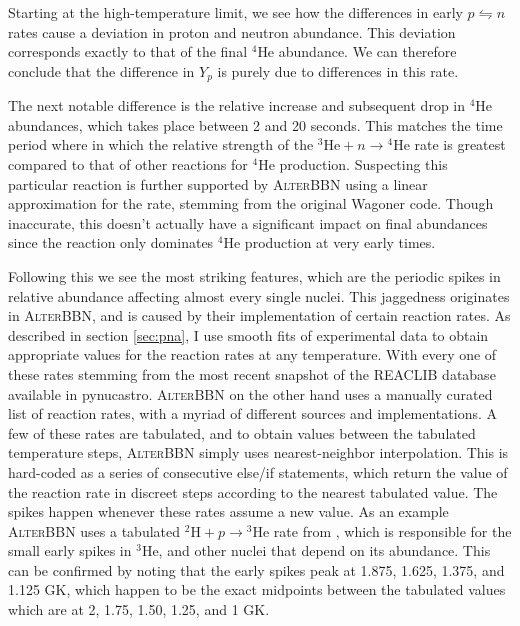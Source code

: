 Starting at the high-temperature limit, we see how the differences in early $p\leftrightharpoons n$ rates cause a deviation in proton and neutron abundance. This deviation corresponds exactly to that of the final ${}^4$He abundance. We can therefore conclude that the difference in $Y_p$ is purely due to differences in this rate. 

The next notable difference is the relative increase and subsequent drop in ${}^4\text{He}$ abundances, which takes place between 2 and 20 seconds. This matches the time period where in which the relative strength of the ${}^3\text{He}+n\rightarrow {}^4\text{He}$ rate is greatest compared to that of other reactions for ${}^4$He production. Suspecting this particular reaction is further supported by \textsc{AlterBBN} using a linear approximation for the rate, stemming from the original Wagoner code\cite{Wagoner69}. Though inaccurate, this doesn't actually have a significant impact on final abundances since the reaction only dominates ${}^4\text{He}$ production at very early times. 

Following this we see the most striking features, which are the periodic spikes in relative abundance affecting almost every single nuclei. This jaggedness originates in \textsc{AlterBBN}, and is caused by their implementation of certain reaction rates. As described in section \ref{sec:pna}, I use smooth fits of experimental data to obtain appropriate values for the reaction rates at any temperature. With every one of these rates stemming from the most recent snapshot of the REACLIB database\cite{REACLIB} available in pynucastro\cite{pynucastro2}. \textsc{AlterBBN} on the other hand uses a manually curated list of reaction rates, with a myriad of different sources and implementations. A few of these rates are tabulated, and to obtain values between the tabulated temperature steps, \textsc{AlterBBN} simply uses nearest-neighbor interpolation. This is hard-coded as a series of consecutive else/if statements, which return the value of the reaction rate in discreet steps according to the nearest tabulated value. The spikes happen whenever these rates assume a new value. As an example \textsc{AlterBBN} uses a tabulated ${}^2\text{H}+p\rightarrow {}^3\text{He}$ rate from \textcite{Coc_et_al_2015}, which is responsible for the small early spikes in ${}^3\text{He}$, and other nuclei that depend on its abundance. This can be confirmed by noting that the early spikes peak at 1.875, 1.625, 1.375, and 1.125 GK, which happen to be the exact midpoints between the tabulated values which are at 2, 1.75, 1.50, 1.25, and 1 GK. 


